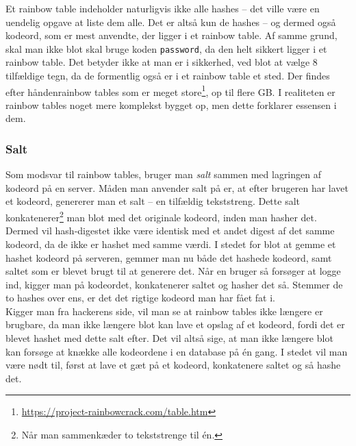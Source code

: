     Et rainbow table indeholder naturligvis ikke alle hashes -- det ville være en uendelig opgave at liste dem alle.
    Det er altså kun de hashes -- og dermed også kodeord, som er mest anvendte, der ligger i et rainbow table.
    Af samme grund, skal man ikke blot skal bruge koden \texttt{password}, da den helt sikkert ligger i et rainbow table.
    Det betyder ikke at man er i sikkerhed, ved blot at vælge 8 tilfældige tegn, da de formentlig også er i et rainbow table et sted.
    Der findes efter håndenrainbow tables som er meget store\footnote{\url{https://project-rainbowcrack.com/table.htm}}, op til flere GB.
    I realiteten er rainbow tables noget mere komplekst bygget op, men dette forklarer essensen i dem.


    \subsubsection{Salt}
    Som modsvar til rainbow tables, bruger man \emph{salt} sammen med lagringen af kodeord på en server. \cite{version2}
    Måden man anvender salt på er, at efter brugeren har lavet et kodeord, genererer man et salt -- en tilfældig tekststreng.
    Dette salt konkatenerer\footnote{Når man sammenkæder to tekststrenge til én.} man blot med det originale kodeord, inden man hasher det.
    Dermed vil hash-digestet ikke være identisk med et andet digest af det samme kodeord, da de ikke er hashet med samme værdi.
    I stedet for blot at gemme et hashet kodeord på serveren, gemmer man nu både det hashede kodeord, samt saltet som er blevet brugt til at generere det.
    Når en bruger så forsøger at logge ind, kigger man på kodeordet, konkatenerer saltet og hasher det så.
    Stemmer de to hashes over ens, er det det rigtige kodeord man har fået fat i.\\
    Kigger man fra hackerens side, vil man se at rainbow tables ikke længere er brugbare, da man ikke længere blot kan lave et opslag af et kodeord, fordi det er blevet hashet med dette salt efter.
    Det vil altså sige, at man ikke længere blot kan forsøge at knække alle kodeordene i en database på én gang.
    I stedet vil man være nødt til, først at lave et gæt på et kodeord, konkatenere saltet og så hashe det.

